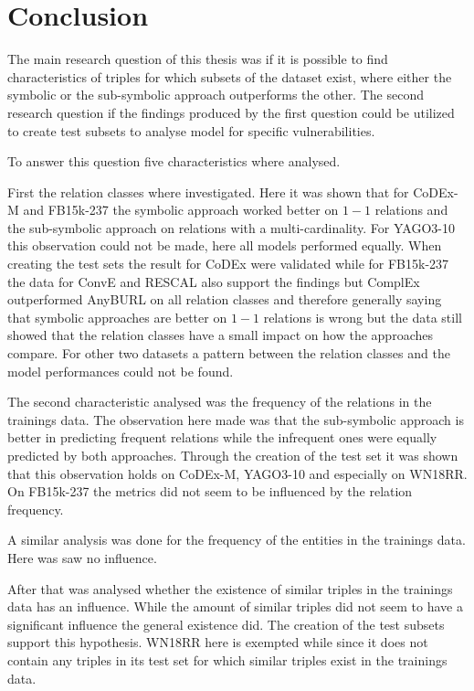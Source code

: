 \chapter{Conclusion}
\label{cha:conclusion}

The main research question of this thesis was if it is possible to find characteristics of triples for which subsets of the dataset exist, where either the symbolic or the sub-symbolic approach outperforms the other. The second research question if the findings produced by the first question could be utilized to create test subsets to analyse model for specific vulnerabilities.

To answer this question five characteristics where analysed. 

First the relation classes where investigated. Here it was shown that for CoDEx-M and FB15k-237 the symbolic approach worked better on $1-1$ relations and the sub-symbolic approach on relations with a multi-cardinality. For YAGO3-10 this observation could not be made, here all models performed equally. 
When creating the test sets the result for CoDEx were validated while for FB15k-237 the data for ConvE and RESCAL also support the findings but ComplEx outperformed AnyBURL on all relation classes and therefore generally saying that symbolic approaches are better on $1-1$ relations is wrong but the data still showed that the relation classes have a small impact on how the approaches compare. For other two datasets a pattern between the relation classes and the model performances could not be found.

The second characteristic analysed was the frequency of the relations in the trainings data. The observation here made was that the sub-symbolic approach is better in predicting frequent relations while the infrequent ones were equally predicted by both approaches. Through the creation of the test set it was shown that this observation holds on CoDEx-M, YAGO3-10 and especially on WN18RR. On FB15k-237 the metrics did not seem to be influenced by the relation frequency.

A similar analysis was done for the frequency of the entities in the trainings data. Here was saw no influence. 

After that was analysed whether the existence of similar triples in the trainings data has an influence. While the amount of similar triples did not seem to have a significant influence the general existence did. The creation of the test subsets support this hypothesis. WN18RR here is exempted while since it does not contain any triples in its test set for which similar triples exist in the trainings data.

